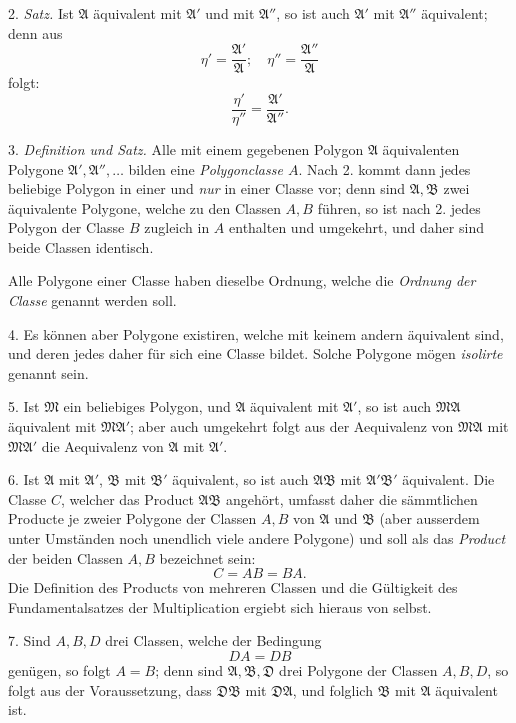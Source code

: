 \documentclass{article}
\begin{document}
2. \emph{Satz.} Ist $\mathfrak{A}$ äquivalent mit $\mathfrak{A}'$ und mit $\mathfrak{A}''$, so ist auch $\mathfrak{A}'$ mit $\mathfrak{A}''$ äquivalent; denn aus
\[ \eta' = \frac{\mathfrak{A}'}{\mathfrak{A}}; \quad \eta'' = \frac{\mathfrak{A}''}{\mathfrak{A}} \]
folgt:
\[ \frac{\eta'}{\eta''} = \frac{\mathfrak{A}'}{\mathfrak{A}''}. \]

3. \emph{Definition und Satz.} Alle mit einem gegebenen Polygon $\mathfrak{A}$ äquivalenten Polygone $\mathfrak{A}', \mathfrak{A}'', \ldots$ bilden eine \emph{Polygonclasse $A$}. Nach 2. kommt dann jedes beliebige Polygon in einer und \emph{nur} in einer Classe vor; denn sind $\mathfrak{A}, \mathfrak{B}$ zwei äquivalente Polygone, welche zu den Classen $A, B$ führen, so ist nach 2. jedes Polygon der Classe $B$ zugleich in $A$ enthalten und umgekehrt, und daher sind beide Classen identisch.

Alle Polygone einer Classe haben dieselbe Ordnung, welche die \emph{Ordnung der Classe} genannt werden soll.

4. Es können aber Polygone existiren, welche mit keinem andern äquivalent sind, und deren jedes daher für sich eine Classe bildet. Solche Polygone mögen \emph{isolirte} genannt sein.

5. Ist $\mathfrak{M}$ ein beliebiges Polygon, und $\mathfrak{A}$ äquivalent mit $\mathfrak{A}'$, so ist auch $\mathfrak{M}\mathfrak{A}$ äquivalent mit $\mathfrak{M}\mathfrak{A}'$; aber auch umgekehrt folgt aus der Aequivalenz von $\mathfrak{M}\mathfrak{A}$ mit $\mathfrak{M}\mathfrak{A}'$ die Aequivalenz von $\mathfrak{A}$ mit $\mathfrak{A}'$.

6. Ist $\mathfrak{A}$ mit $\mathfrak{A}'$, $\mathfrak{B}$ mit $\mathfrak{B}'$ äquivalent, so ist auch $\mathfrak{A}\mathfrak{B}$ mit $\mathfrak{A}'\mathfrak{B}'$ äquivalent. Die Classe $C$, welcher das Product $\mathfrak{A}\mathfrak{B}$ angehört, umfasst daher die sämmtlichen Producte je zweier Polygone der Classen $A, B$ von $\mathfrak{A}$ und $\mathfrak{B}$ (aber ausserdem unter Umständen noch unendlich viele andere Polygone) und soll als das \emph{Product} der beiden Classen $A, B$ bezeichnet sein:
\[ C = AB = BA. \]
Die Definition des Products von mehreren Classen und die Gültigkeit des Fundamentalsatzes der Multiplication ergiebt sich hieraus von selbst.

7. Sind $A, B, D$ drei Classen, welche der Bedingung
\[ DA = DB \]
genügen, so folgt $A = B$; denn sind $\mathfrak{A}, \mathfrak{B}, \mathfrak{D}$ drei Polygone der Classen $A, B, D$, so folgt aus der Voraussetzung, dass $\mathfrak{D}\mathfrak{B}$ mit $\mathfrak{D}\mathfrak{A}$, und folglich $\mathfrak{B}$ mit $\mathfrak{A}$ äquivalent ist.
\end{document}
